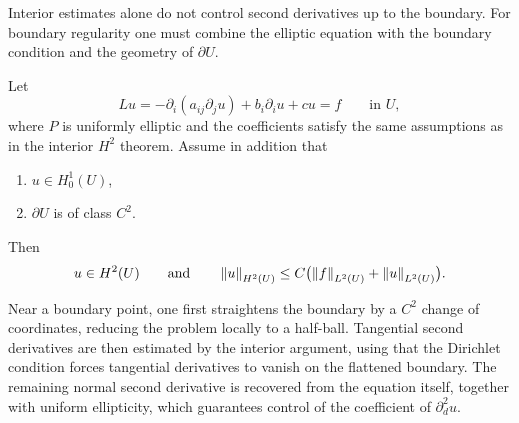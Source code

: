 Interior estimates alone do not control second derivatives up to the boundary. For boundary regularity one must combine the elliptic equation with the boundary condition and the geometry of $\partial U$.

\begin{theorem}
Let
\[
Lu = -\partial_i(a_{ij}\partial_j u) + b_i\partial_i u + cu = f
\qquad \text{in }U,
\]
where $P$ is uniformly elliptic and the coefficients satisfy the same assumptions as in the interior $H^2$ theorem. Assume in addition that
\begin{enumerate}
    \item $u\in H_0^1(U)$,
    \item $\partial U$ is of class $C^2$.
\end{enumerate}
Then
\[
u\in H^2(U)
\qquad \text{and} \qquad
\left\lVert u \right\rVert_{H^2(U)} \leq C\bigl(\left\lVert f \right\rVert_{L^2(U)} + \left\lVert u \right\rVert_{L^2(U)}\bigr).
\]
\end{theorem}

\begin{remark}
Near a boundary point, one first straightens the boundary by a $C^2$ change of coordinates, reducing the problem locally to a half-ball. Tangential second derivatives are then estimated by the interior argument, using that the Dirichlet condition forces tangential derivatives to vanish on the flattened boundary. The remaining normal second derivative is recovered from the equation itself, together with uniform ellipticity, which guarantees control of the coefficient of $\partial_d^2 u$.
\end{remark}
